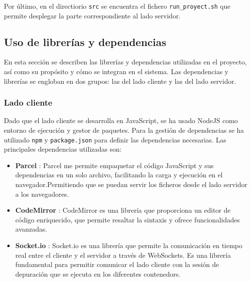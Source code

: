 Por último, en el directiorio \texttt{src} se encuentra el fichero \texttt{run\_proyect.sh} que permite desplegar la parte correspondiente al lado servidor. 

\subsection{Uso de librerías y dependencias} \label{subsec:uso_librerias_dependencias}

En esta sección se describen las librerías y dependencias utilizadas en el proyecto, así como su propósito y cómo se integran en el sistema. Las dependencias y librerías se engloban en dos grupos: las del lado cliente y las del lado servidor.

\subsubsection{Lado cliente}
Dado que el lado cliente se desarrolla en JavaScript, se ha usado NodeJS como entorno de ejecución y gestor de paquetes. Para la gestión de dependencias se ha utilizado \texttt{npm} y \texttt{package.json} para definir las dependencias necesarias.
Las principales dependencias utilizadas son:
\begin{itemize}
    \item \textbf{Parcel} \cite{parcel}: Parcel me permite empaquetar el código JavaScript y sus dependencias en un solo archivo, facilitando la carga y ejecución en el navegador.Permitiendo que se puedan servir los ficheros desde el lado servidor a los navegadores.
    \item \textbf{CodeMirror} \cite{codemirror}: CodeMirror es una librería que proporciona un editor de código enriquecido, que permite resaltar la sintaxis y ofrece funcionalidades avanzadas.
    \item \textbf{Socket.io} \cite{socket.io}: Socket.io es una librería que permite la comunicación en tiempo real entre el cliente y el servidor a través de WebSockets. Es una librería fundamental para permitir comunicar el lado cliente con la sesión de depuración que se ejecuta en los diferentes \glspl{contenedor}.
\end{itemize}

